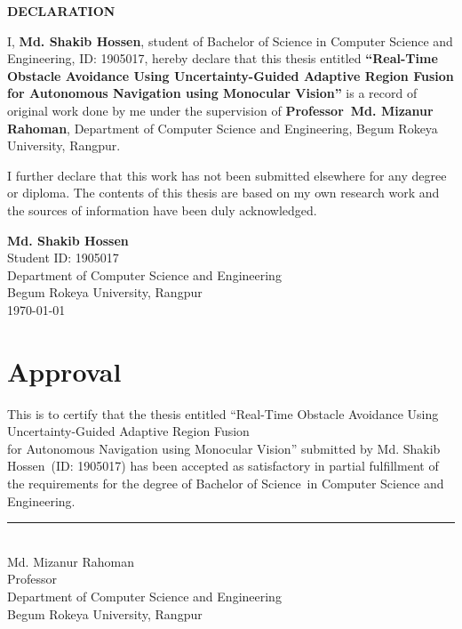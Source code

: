 \documentclass[12pt,oneside]{book}
\newcommand{\thesistitle}{Real-Time Obstacle Avoidance Using Uncertainty-Guided Adaptive Region Fusion\\for Autonomous Navigation using Monocular Vision}
\newcommand{\theauthor}{Md. Shakib Hossen}
\newcommand{\thedegree}{Bachelor of Science}
\newcommand{\themajor}{Computer Science and Engineering}
\newcommand{\thesupervisor}{Md. Mizanur Rahoman}
\newcommand{\thesupervisortitle}{Professor}
\newcommand{\thedepartment}{Department of Computer Science and Engineering}
\newcommand{\theuniversity}{Begum Rokeya University, Rangpur}
\begin{document}


\thispagestyle{empty}
\vspace*{1cm}

\begin{center}
    {\Large\bfseries DECLARATION}
\end{center}

\vspace{0.8cm}

I, \textbf{\theauthor}, student of Bachelor of Science in Computer Science and Engineering, ID: 1905017, hereby declare that this thesis entitled \textbf{``\thesistitle''} is a record of original work done by me under the supervision of \textbf{\thesupervisortitle~\thesupervisor}, Department of Computer Science and Engineering, Begum Rokeya University, Rangpur.

\vspace{0.8cm}

I further declare that this work has not been submitted elsewhere for any degree or diploma. The contents of this thesis are based on my own research work and the sources of information have been duly acknowledged.

\vspace{2cm}

\begin{flushright}
    \textbf{\theauthor}\\
    Student ID: 1905017\\
    Department of Computer Science and Engineering\\
    Begum Rokeya University, Rangpur\\
    \today
\end{flushright}

\clearpage

\chapter*{Approval}
\thispagestyle{empty}
This is to certify that the thesis entitled ``\thesistitle'' submitted by \theauthor\ (ID: 1905017) has been accepted as satisfactory in partial fulfillment of the requirements for the degree of \thedegree\ in \themajor.

\vspace{3cm}
\noindent
\rule{7cm}{0.5pt}\\
\thesupervisor\\
\thesupervisortitle\\
\thedepartment\\
\theuniversity
\end{document}
